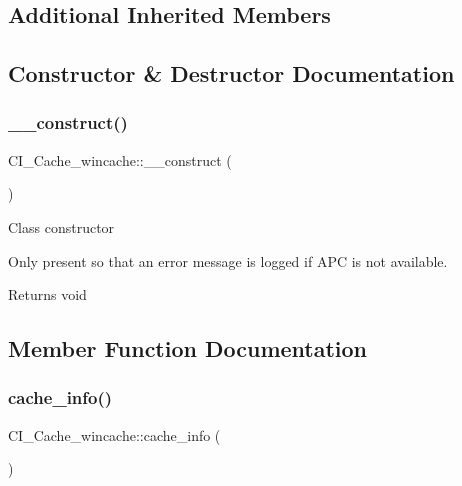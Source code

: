 \subsection*{Additional Inherited Members}


\subsection{Constructor \& Destructor Documentation}
\mbox{\label{class_c_i___cache__wincache_abf1ed6f7d95ae8d31d31a00451f79b3c}} 
\subsubsection{\texorpdfstring{\+\_\+\+\_\+construct()}{\_\_construct()}}
{\footnotesize\ttfamily C\+I\+\_\+\+Cache\+\_\+wincache\+::\+\_\+\+\_\+construct (\begin{DoxyParamCaption}{ }\end{DoxyParamCaption})}

Class constructor

Only present so that an error message is logged if A\+PC is not available.

\begin{DoxyReturn}{Returns}
void 
\end{DoxyReturn}


\subsection{Member Function Documentation}
\mbox{\label{class_c_i___cache__wincache_a22f6cbd9c6436a4c30b49c7d20fbf520}} 
\subsubsection{\texorpdfstring{cache\+\_\+info()}{cache\_info()}}
{\footnotesize\ttfamily C\+I\+\_\+\+Cache\+\_\+wincache\+::cache\+\_\+info (\begin{DoxyParamCaption}{ }\end{DoxyParamCaption})}

